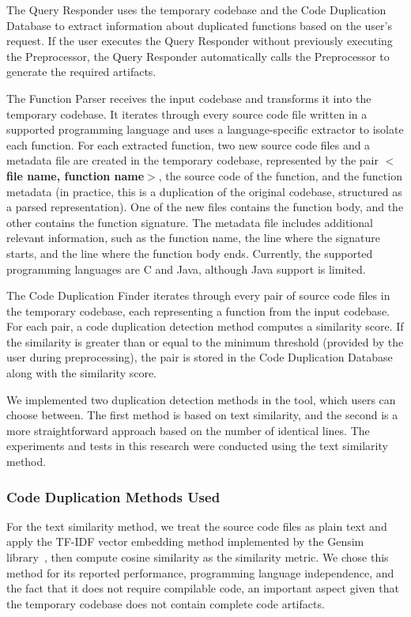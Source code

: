 \documentclass[conference]{IEEEtran}
\begin{document}
The Query Responder uses the temporary codebase and the Code Duplication Database to extract 
information about duplicated functions based on the user's request. If the user executes the Query Responder
without previously executing the Preprocessor, the Query Responder automatically 
calls the Preprocessor to generate the required artifacts.

The Function Parser receives the input codebase and transforms it into the temporary
codebase. It iterates through every source code file written in a supported programming 
language and uses a language-specific extractor to isolate each function. For each extracted 
function, two new source code files and a metadata file are created in the temporary codebase, 
represented by the pair \textbf{$<$file name, function name$>$}, the source code of the function, 
and the function metadata (in practice, this is a duplication of the original codebase, 
structured as a parsed representation). One of the new files contains the function body, and the other 
contains the function signature. The metadata file includes additional relevant information,
such as the function name, the line where the signature starts, and the line where the function 
body ends. Currently, the supported programming languages are C and Java, although Java support is limited.

The Code Duplication Finder iterates through every pair of source code files in the
temporary codebase, each representing a function from the input codebase. For each pair,
a code duplication detection method computes a similarity score. If the similarity is greater 
than or equal to the minimum threshold (provided by the user during preprocessing), the pair 
is stored in the Code Duplication Database along with the similarity score.

We implemented two duplication detection methods in the tool, which users can choose 
between. The first method is based on text similarity, and the second is a more straightforward approach 
based on the number of identical lines. The experiments and tests in this research were 
conducted using the text similarity method.


\subsubsection{Code Duplication Methods Used}

For the text similarity method, we treat the source code files as plain text and apply the
TF-IDF vector embedding method implemented by the Gensim library~\cite{gensim}, then compute cosine similarity as the similarity metric. We chose this method for its reported performance, programming language independence, and the fact that it does 
not require compilable code, an important aspect given that the temporary codebase does not contain complete code artifacts.
\end{document}
